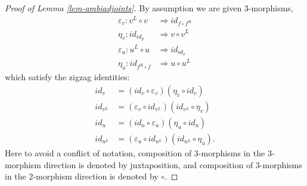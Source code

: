 \documentclass{amsart}
\begin{document}
\begin{proof}[Proof of Lemma \ref{lem-ambiadjoints}]
By assumption we are given 3-morphisms,
\begin{align*}
	\varepsilon_v: v^L \circ v & \Rightarrow id_{f \circ f^R} \\
	\eta_v: id_{id_y} & \Rightarrow v \circ v^L \\
	\varepsilon_u: u^L \circ u & \Rightarrow id_{id_x} \\
	\eta_u: id_{f^R \circ f} & \Rightarrow  u \circ u^L
\end{align*}
which satisfy the zigzag identities:
\begin{align*}
	 id_v  &= (id_v \circ \varepsilon_v) (\eta_v \circ id_v)  \\
	 id_{v^L}  &= (\varepsilon_v \circ id_{v^L} ) (id_{v^L} \circ \eta_v)  \\
	 id_u  &= (id_u \circ \varepsilon_u) (\eta_u \circ id_u)  \\
	 id_{u^L}  &= (\varepsilon_u \circ id_{u^L} ) (id_{u^L} \circ \eta_u).  
\end{align*}
Here to avoid a conflict of notation, composition of 3-morphisms in the 3-morphism direction is denoted by juxtaposition, and composition of 3-morphisms in the 2-morphism direction is denoted by $\circ$.


\end{proof}
\end{document}
